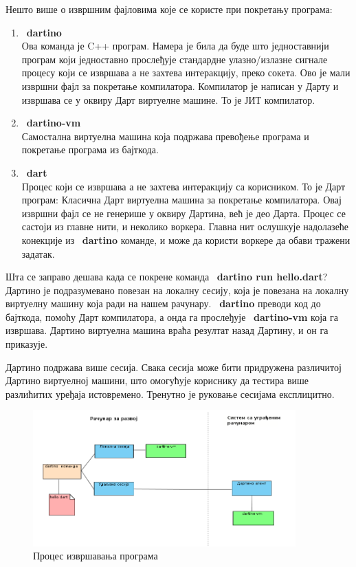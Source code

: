 \documentclass[12pt,oneside]{memoir}
\begin{document}
Нешто више о извршним фајловима које се користе при покретању програма:
\begin{enumerate}
\item ~\textbf{dartino}\\
Ова команда је C++ програм. Намера је била да буде што једноставнији програм који једноставно прослеђује стандардне улазно/излазне сигнале процесу који се извршава а не захтева интеракцију, преко сокета. Ово је мали извршни фајл за покретање компилатора. Компилатор је написан у Дарту и извршава се у оквиру Дарт виртуелне машине. То је ЈИТ компилатор.
\item ~\textbf{dartino-vm} \\
Самостална виртуелна машина која подржава превођење програма и покретање програма из бајткода.
\item ~\textbf{dart} \\
Процес који се извршава а не захтева интеракцију са корисником. То је Дарт програм: Класична Дарт виртуелна машина за покретање компилатора. Овај извршни фајл се не генерише у оквиру Дартина, већ је део Дарта. Процес се састоји из главне нити, и неколико воркера. Главна нит ослушкује надолазеће конекције из ~\textbf{dartino} команде, и може да користи воркере да обави тражени задатак.
\end{enumerate}

Шта се заправо дешава када се покрене команда ~\textbf{dartino run hello.dart}? Дартино је подразумевано повезан на локалну сесију, која је повезана на локалну виртуелну машину која ради на нашем рачунару. ~\textbf{dartino} преводи код до бајткода, помоћу Дарт компилатора, а онда га прослеђује ~\textbf{dartino-vm} која га извршава. Дартино виртуелна машина враћа резултат назад Дартину, и он га приказује.

Дартино подржава више сесија. Свака сесија може бити придружена различитој Дартино виртуелној машини, што омогућује кориснику да тестира више разлићитих уређаја истовремено. Тренутно је руковање сесијама експлицитно.

\begin{figure}[!ht]
  \centering
  \includegraphics[width=0.9\textwidth]{sesije.png}
  \caption{Процес извршавања програма}
  \label{fig:izvrsavanje}
\end{figure}
\end{document}
